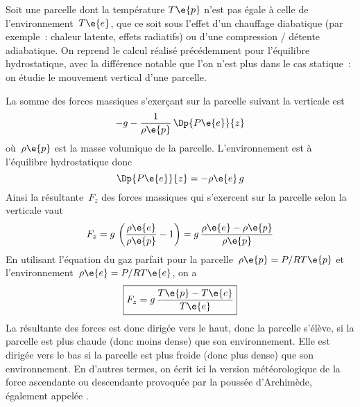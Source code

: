 \sk
Soit une parcelle dont la température $T\e{p}$ n'est pas égale à celle de l'environnement~$T\e{e}$, que ce soit sous l'effet d'un chauffage diabatique (par exemple~: chaleur latente, effets radiatifs) ou d'une compression / détente adiabatique. On reprend le calcul réalisé précédemment pour l'équilibre hydrostatique, avec la différence notable que l'on n'est plus dans le cas statique~: on étudie le mouvement vertical d'une parcelle. 

\sk
La somme des forces massiques s'exerçant sur la parcelle suivant la verticale est
\[ - g  - \frac{1}{\rho\e{p}}  \, \Dp{P\e{e}}{z} \]
où~$\rho\e{p}$ est la masse volumique de la parcelle. L'environnement est à l'équilibre hydrostatique donc
\[ \Dp{P\e{e}}{z} = - \rho\e{e} \, g \]
Ainsi la résultante~$F_z$ des forces massiques qui s'exercent sur la parcelle selon la verticale vaut
\[ F_z = g \, \left( \frac{\rho\e{e}}{\rho\e{p}} - 1 \right) = g \, \frac{\rho\e{e}-\rho\e{p}}{\rho\e{p}} \]
En utilisant l'équation du gaz parfait pour la parcelle~$\rho\e{p}=P/RT\e{p}$ et l'environnement~$\rho\e{e}=P/RT\e{e}$, on a
\[ \boxed{ F_z = g \, \frac{T\e{p}-T\e{e}}{T\e{e}} } \]
La résultante des forces est donc dirigée vers le haut, donc la parcelle s'élève, si la parcelle est plus chaude (donc moins dense) que son environnement. 
Elle est dirigée vers le bas si la parcelle est plus froide (donc plus dense) que son environnement.
En d'autres termes, on écrit ici la version météorologique de la force ascendante ou descendante 
provoquée par la poussée d'Archimède, également appelée .
